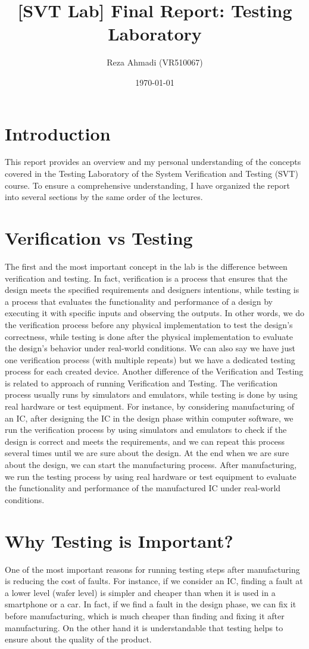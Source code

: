 \documentclass[12pt, a4paper, twocolumn]{article}
\title{[SVT Lab] Final Report: Testing Laboratory}
\author{Reza Ahmadi (VR510067)}
\date{\today}
\begin{document}
\maketitle


\section{Introduction}
This report provides an overview and my personal understanding of the concepts covered in the Testing Laboratory of the System Verification and Testing (SVT) course.
To ensure a comprehensive understanding, I have organized the report into several sections by the same order of the lectures.

\section{Verification vs Testing}
The first and the most important concept in the lab is the difference between verification and testing.
In fact, verification is a process that ensures that the design meets the specified requirements and designers intentions, while testing is a process that evaluates the functionality and performance of a design by executing it with specific inputs and observing the outputs.
In other words, we do the verification process before any physical implementation to test the design's correctness, while testing is done after the physical implementation to evaluate the design's behavior under real-world conditions.
We can also say we have just one verification process (with multiple repeats) but we have a dedicated testing process for each created device.
Another difference of the Verification and Testing is related to approach of running Verification and Testing.
The verification process usually runs by simulators and emulators, while testing is done by using real hardware or test equipment.
For instance, by considering manufacturing of an IC, after designing the IC in the design phase within computer software, we run the verification process by using simulators and emulators to check if the design is correct and meets the requirements, and we can repeat this process several times until we are sure about the design.
At the end when we are sure about the design, we can start the manufacturing process.
After manufacturing, we run the testing process by using real hardware or test equipment to evaluate the functionality and performance of the manufactured IC under real-world conditions.

\section{Why Testing is Important?}
One of the most important reasons for running testing steps after manufacturing is reducing the cost of faults.
For instance, if we consider an IC, finding a fault at a lower level (wafer level) is simpler and cheaper than when it is used in a smartphone or a car.
In fact, if we find a fault in the design phase, we can fix it before manufacturing, which is much cheaper than finding and fixing it after manufacturing.
On the other hand it is understandable that testing helps to ensure about the quality of the product.
\end{document}
